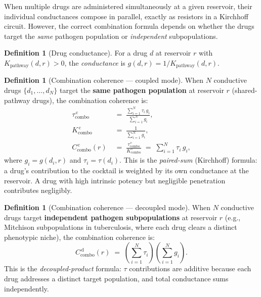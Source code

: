 \documentclass[11pt]{article}
\theoremstyle{plain}
\theoremstyle{definition}
\newtheorem{definition}[theorem]{Definition}
\newcommand{\Kpath}{K_{\mathrm{pathway}}}
\newcommand{\Ccombo}{C_{\mathrm{combo}}}
\begin{document}
When multiple drugs are administered simultaneously at a given
reservoir, their individual conductances compose in parallel, exactly
as resistors in a Kirchhoff circuit. However, the correct combination
formula depends on whether the drugs target the \emph{same} pathogen
population or \emph{independent} subpopulations.

\begin{definition}[Drug conductance]
\label{def:conductance}
For a drug $d$ at reservoir $r$ with $\Kpath(d, r) > 0$, the
\emph{conductance} is $g(d, r) = 1 / \Kpath(d, r)$.
\end{definition}

\begin{definition}[Combination coherence --- coupled mode]
\label{def:combination-coupled}
When $N$ conductive drugs $\{d_1, \ldots, d_N\}$ target the
\textbf{same pathogen population} at reservoir $r$ (shared-pathway
drugs), the combination coherence is:
\begin{align}
  \label{eq:tau-combo-coupled}
  \tau_{\mathrm{combo}}^{\,\mathrm{c}} &\;=\;
    \frac{\displaystyle\sum_{i=1}^{N} \tau_i \, g_i}
         {\displaystyle\sum_{i=1}^{N} g_i},
  \\[6pt]
  \label{eq:k-combo-coupled}
  K_{\mathrm{combo}}^{\,\mathrm{c}} &\;=\;
    \frac{1}{\displaystyle\sum_{i=1}^{N} g_i},
  \\[6pt]
  \label{eq:c-combo-coupled}
  \Ccombo^{\,\mathrm{c}}(r) &\;=\;
    \frac{\tau_{\mathrm{combo}}^{\,\mathrm{c}}}
         {K_{\mathrm{combo}}^{\,\mathrm{c}}}
  \;=\; \sum_{i=1}^{N} \tau_i \, g_i,
\end{align}
where $g_i = g(d_i, r)$ and $\tau_i = \tau(d_i)$. This is the
\emph{paired-sum} (Kirchhoff) formula: a drug's contribution to
the cocktail is weighted by its own conductance at the reservoir.
A drug with high intrinsic potency but negligible penetration
contributes negligibly.
\end{definition}

\begin{definition}[Combination coherence --- decoupled mode]
\label{def:combination-decoupled}
When $N$ conductive drugs target \textbf{independent pathogen
subpopulations} at reservoir $r$ (e.g., Mitchison subpopulations
in tuberculosis, where each drug clears a distinct phenotypic niche),
the combination coherence is:
\begin{equation}
  \label{eq:c-combo-decoupled}
  \Ccombo^{\,\mathrm{d}}(r) \;=\;
    \left(\sum_{i=1}^{N} \tau_i\right)
    \left(\sum_{i=1}^{N} g_i\right).
\end{equation}
This is the \emph{decoupled-product} formula: $\tau$ contributions are
additive because each drug addresses a distinct target population,
and total conductance sums independently.
\end{definition}
\end{document}
